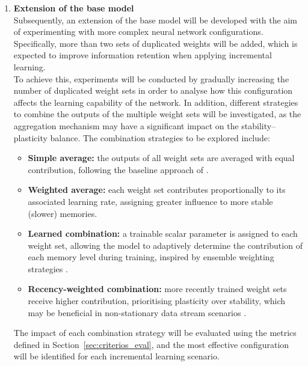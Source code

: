 \begin{enumerate}
    \item \textbf{Extension of the base model} \\
    Subsequently, an extension of the base model will be developed with the aim of 
    experimenting with more complex neural network configurations. Specifically, more 
    than two sets of duplicated weights will be added, which is expected to improve 
    information retention when applying incremental learning. \\
    To achieve this, experiments will be conducted by gradually increasing the number 
    of duplicated weight sets in order to analyse how this configuration affects the 
    learning capability of the network. In addition, different strategies to combine 
    the outputs of the multiple weight sets will be investigated, as the aggregation 
    mechanism may have a significant impact on the stability--plasticity balance. 
    The combination strategies to be explored include:
    \begin{itemize}
        \item \textbf{Simple average:} the outputs of all weight sets are averaged 
        with equal contribution, following the baseline approach of 
        \cite{bullinaria2009}.
        \item \textbf{Weighted average:} each weight set contributes proportionally 
        to its associated learning rate, assigning greater influence to more stable 
        (slower) memories.
        \item \textbf{Learned combination:} a trainable scalar parameter is assigned 
        to each weight set, allowing the model to adaptively determine the 
        contribution of each memory level during training, inspired by ensemble 
        weighting strategies \cite{krawczyk2017ensemble}.
        \item \textbf{Recency-weighted combination:} more recently trained weight 
        sets receive higher contribution, prioritising plasticity over stability, 
        which may be beneficial in non-stationary data stream scenarios 
        \cite{gomes2017survey}.
    \end{itemize}
    The impact of each combination strategy will be evaluated using the metrics 
    defined in Section~\ref{sec:criterios_eval}, and the most effective configuration 
    will be identified for each incremental learning scenario.


\end{enumerate}

